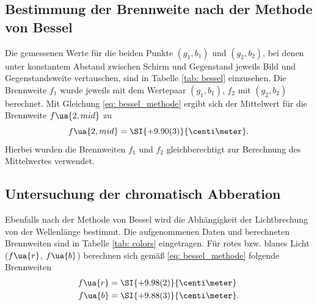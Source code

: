 \subsection{Bestimmung der Brennweite nach der Methode von Bessel}
Die gemessenen Werte für die beiden Punkte $(g_1, b_1)$ und $(g_2, b_2)$, bei denen unter konstantem Abstand
zwischen Schirm und Gegenstand jeweils Bild und Gegenstandsweite
vertauschen, sind in Tabelle \ref{tab: bessel} einzusehen. Die Brennweite $f_1$
wurde jeweils mit dem Wertepaar $(g_1, b_1)$, $f_2$
mit $(g_2, b_2)$ berechnet. Mit Gleichung \eqref{eq: bessel_methode} ergibt sich der Mittelwert für
die Brennweite $f\ua{2, mid}$ zu
\begin{equation}
  f\ua{2, mid} = \SI{+9.90(3)}{\centi\meter}. %
  \label{eq: f_bessel}
\end{equation}
Hierbei wurden die Brennweiten $f_1$ und $f_2$ gleichberechtigt zur Berechnung des Mittelwertes verwendet.

\subsection{Untersuchung der chromatisch Abberation}
Ebenfalls nach der Methode von Bessel wird die Abhängigkeit der Lichtbrechung von der Wellenlänge bestimmt. Die aufgenommenen
Daten und berechneten Brennweiten sind in Tabelle \ref{tab: colors} eingetragen. Für rotes bzw. blaues Licht ($f\ua{r}$, $f\ua{b}$) berechnen sich gemäß \eqref{eq: bessel_methode}
folgende Brennweiten
\begin{align}
  f\ua{r} &= \SI{+9.98(2)}{\centi\meter} \\
  f\ua{b} &= \SI{+9.88(3)}{\centi\meter}.
\end{align}

